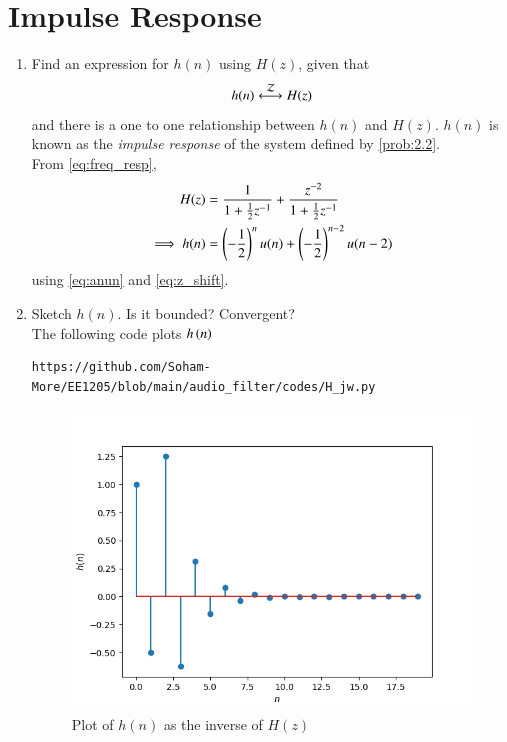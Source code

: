\documentclass[journal,12pt,twocolumn]{IEEEtran}
\theoremstyle{remark}
\begin{document}
\section{Impulse Response}
\begin{enumerate}[label=\thesection.\arabic*]
\item \label{prob:impulse_resp}
Find an expression for $h(n)$ using $H(z)$, given that 
\begin{equation}
    h(n) \system{Z} H(z)
    \label{eq:impulse_resp}
\end{equation}
and there is a one to one relationship between $h(n)$ and $H(z)$. $h(n)$ is known as the {\em impulse response} of the
system defined by \eqref{prob:2.2}.\\
\solution From \eqref{eq:freq_resp},
\begin{align}
H(z) &= \frac{1}{1 + \frac{1}{2}z^{-1}} + \frac{ z^{-2}}{1 + \frac{1}{2}z^{-1}}\\
\implies h(n) &= \left(-\frac{1}{2}\right)^{n}u(n) + \left(-\frac{1}{2}\right)^{n-2}u(n-2)
\end{align}
using \eqref{eq:anun} and \eqref{eq:z_shift}.

\item Sketch $h(n)$. Is it bounded? Convergent? 
\\
\solution The following code plots $h\left(n\right)$ 
\begin{lstlisting}
https://github.com/Soham-More/EE1205/blob/main/audio_filter/codes/H_jw.py
\end{lstlisting}
\begin{figure}[ht]
    \centering
    \includegraphics[width=\columnwidth]{figs/h_n.png}
    \caption{Plot of $h(n)$ as the inverse of $H(z)$}
    \label{fig:hn}
\end{figure}


\end{enumerate}
\end{document}
